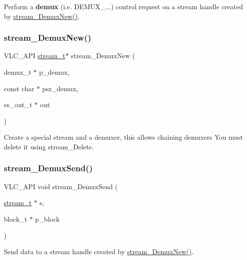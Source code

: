 Perform a {\bfseries demux} (i.\+e. D\+E\+M\+U\+X\+\_\+...) control request on a stream handle created by \hyperlink{group__stream_gaa9684498d9b82c8d7af5ede5a1692a2a}{stream\+\_\+\+Demux\+New()}. \mbox{\label{group__stream_gaa9684498d9b82c8d7af5ede5a1692a2a}} 
\subsubsection{\texorpdfstring{stream\+\_\+\+Demux\+New()}{stream\_DemuxNew()}}
{\footnotesize\ttfamily V\+L\+C\+\_\+\+A\+PI \hyperlink{structstream__t}{stream\+\_\+t}$\ast$ stream\+\_\+\+Demux\+New (\begin{DoxyParamCaption}\item[{demux\+\_\+t $\ast$}]{p\+\_\+demux,  }\item[{const char $\ast$}]{psz\+\_\+demux,  }\item[{es\+\_\+out\+\_\+t $\ast$}]{out }\end{DoxyParamCaption})}

Create a special stream and a demuxer, this allows chaining demuxers You must delete it using stream\+\_\+\+Delete. \mbox{\label{group__stream_ga337f45a362c389f9cb7f74fb8c48bee7}} 
\subsubsection{\texorpdfstring{stream\+\_\+\+Demux\+Send()}{stream\_DemuxSend()}}
{\footnotesize\ttfamily V\+L\+C\+\_\+\+A\+PI void stream\+\_\+\+Demux\+Send (\begin{DoxyParamCaption}\item[{\hyperlink{structstream__t}{stream\+\_\+t} $\ast$}]{s,  }\item[{block\+\_\+t $\ast$}]{p\+\_\+block }\end{DoxyParamCaption})}

Send data to a stream handle created by \hyperlink{group__stream_gaa9684498d9b82c8d7af5ede5a1692a2a}{stream\+\_\+\+Demux\+New()}. \mbox{\label{group__stream_gaa479a3900d7a3ea607d162f41be93d51}} 
